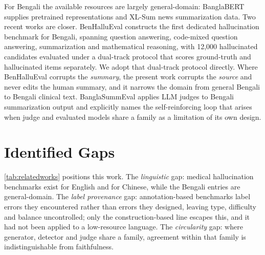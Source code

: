 \documentclass{iutbscthesis}
\begin{document}
For Bengali the available resources are largely general-domain: BanglaBERT \parencite{bhattacharjee2022banglabert} supplies pretrained representations and XL-Sum \parencite{hasan2021xlsum} news summarization data. Two recent works are closer. BenHalluEval \parencite{adib2026benhallueval} constructs the first dedicated hallucination benchmark for Bengali, spanning question answering, code-mixed question answering, summarization and mathematical reasoning, with 12,000 hallucinated candidates evaluated under a dual-track protocol that scores ground-truth and hallucinated items separately. We adopt that dual-track protocol directly. Where BenHalluEval corrupts the \emph{summary}, the present work corrupts the \emph{source} and never edits the human summary, and it narrows the domain from general Bengali to Bengali clinical text. BanglaSummEval \parencite{banglasummeval} applies LLM judges to Bengali summarization output and explicitly names the self-reinforcing loop that arises when judge and evaluated models share a family as a limitation of its own design.

\section{Identified Gaps}

\autoref{tab:relatedworks} positions this work. The \emph{linguistic} gap: medical hallucination benchmarks exist for English and for Chinese, while the Bengali entries are general-domain. The \emph{label provenance} gap: annotation-based benchmarks label errors they encountered rather than errors they designed, leaving type, difficulty and balance uncontrolled; only the construction-based line escapes this, and it had not been applied to a low-resource language. The \emph{circularity} gap: where generator, detector and judge share a family, agreement within that family is indistinguishable from faithfulness.
\end{document}
